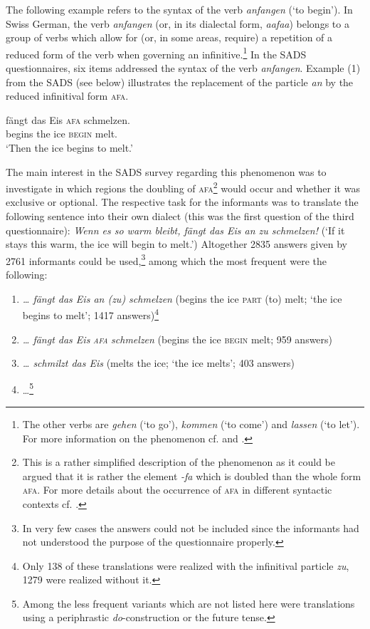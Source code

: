 \documentclass[output=paper]{LSP/langsci}
\begin{document}
The following example refers to the syntax of the verb \emph{anfangen} (‘to begin’). In Swiss German, the verb \emph{anfangen} (or, in its dialectal form, \emph{aafaa}) belongs to a group of verbs which allow for (or, in some areas, require) a repetition of a reduced form of the verb when governing an infinitive.\footnote{The other verbs are \emph{gehen} (‘to go’), \emph{kommen} (‘to come’) and \emph{lassen} (‘to let’). For more information on the phenomenon cf. \citet{glaser_empirische_2011} and \citet{lotscher_zur_1993}.} In the SADS questionnaires, six items addressed the syntax of the verb \emph{anfangen}. Example (1) from the SADS (see below) illustrates the replacement of the particle \emph{an} by the reduced infinitival form \textsc{afa}.

\ea %
\label{ex:1}
\gll [dann]  fängt  das Eis  \textsc{afa} schmelzen.\\
[then]    begins  the ice    \textsc{begin}  melt.	\\
\glt `Then the ice begins to melt.'
\z

The main interest in the SADS survey regarding this phenomenon was to investigate in which regions the doubling of \textsc{afa}\footnote{ This is a rather simplified description of the phenomenon as it could be argued that it is rather the element \emph{{}-fa} which is doubled than the whole form \textsc{afa}. For more details about the occurrence of \textsc{afa} in different syntactic contexts cf. \citet{andres_verdoppelung_2011}.} would occur and whether it was exclusive or optional. The respective task for the informants was to translate the following sentence into their own dialect (this was the first question of the third questionnaire):
\vskip11pt
\emph{Wenn es so warm bleibt, fängt das Eis an zu schmelzen!} (‘If it stays this warm, the ice will begin to melt.’)
\vskip11pt
Altogether 2835 answers given by 2761 informants could be used,\footnote{In very few cases the answers could not be included since the informants had not understood the purpose of the questionnaire properly.} among which the most frequent were the following:

\begin{enumerate}
\item \emph{… fängt das Eis an (zu) schmelzen} (begins the ice \textsc{part} (to) melt; ‘the ice begins to melt’; 1417 answers)\footnote{ Only 138 of these translations were realized with the infinitival particle \emph{zu}, 1279 were realized without it.}

\item \emph{… fängt das Eis }\emph{\textsc{afa}}\emph{ schmelzen} (begins the ice \textsc{begin} melt; 959 answers)

\item \emph{… schmilzt das Eis} (melts the ice; ‘the ice melts’; 403 answers)

\item …\footnote{Among the less frequent variants which are not listed here were translations using a periphrastic \emph{do}{}-construction or the future tense.}
\end{enumerate}
\end{document}
